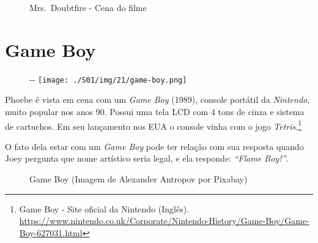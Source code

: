 \begin{figure}
  \centering
    \caption{Mrs. Doubtfire - Cena do filme\label{fig:mrs-doubtfire-cena-do-filme}}
\end{figure}

\hypertarget{game-boy}{%
\section{Game Boy}\label{game-boy}}

\begin{figure}[!ht]
  \begin{adjustwidth}{-\oddsidemargin-1in}{-\rightmargin}
    \centering
    \texttt{[image: ./S01/img/21/game-boy.png]}
  \end{adjustwidth}
\end{figure}

Phoebe é vista em cena com um \emph{Game Boy} (1989), console portátil
da \emph{Nintendo}, muito popular nos anos 90. Possui uma tela LCD com 4
tons de cinza e sistema de cartuchos. Em seu lançamento nos EUA o
console vinha com o jogo \emph{Tetris}.\footnote{\sloppy Game Boy - Site oficial da Nintendo (Inglês). \url{https://www.nintendo.co.uk/Corporate/Nintendo-History/Game-Boy/Game-Boy-627031.html}}

\saveparinfos
\noindent
\begin{minipage}[c]{0.5\textwidth}\useparinfo

O fato dela estar com um \emph{Game Boy} pode ter relação com sua
resposta quando Joey pergunta que nome artístico seria legal, e ela
responde: \emph{``Flame Boy!''}.

\end{minipage}\hfill
\begin{minipage}[c]{0.5\textwidth}

\begin{figure}
  \centering
    \caption{Game Boy (Imagem de Alexander Antropov por Pixabay)\label{fig:game-boy-imagem-de-alexander-antropov-por-pixabay}}
\end{figure}

\end{minipage}

